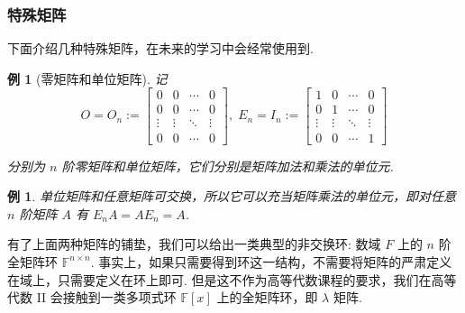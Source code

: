 \documentclass[10pt,openany]{article}
\theoremstyle{thmstyle} %
\theoremstyle{defstyle} %
\theoremstyle{prostyle} %
\theoremstyle{exastyle}
\newtheorem{example}[theorem]{例}
\theoremstyle{remstyle}
\newcommand{\F}{\mathbb{F}}
\begin{document}
\subsubsection{特殊矩阵}

下面介绍几种特殊矩阵，在未来的学习中会经常使用到.

\begin{example}[零矩阵和单位矩阵]
	记
	\[ O=O_n:=\begin{bmatrix}
		0 & 0 & \cdots & 0 \\
		0 & 0 & \cdots & 0 \\
		\vdots & \vdots & \ddots & \vdots \\
		0 & 0 & \cdots & 0
	\end{bmatrix}, \; E_n=I_n:=\begin{bmatrix}
	1 & 0 & \cdots & 0 \\
	0 & 1 & \cdots & 0 \\
	\vdots & \vdots & \ddots & \vdots \\
	0 & 0 & \cdots & 1
	\end{bmatrix} \]
	
	分别为 \( n \) 阶零矩阵和单位矩阵，它们分别是矩阵加法和乘法的单位元.
\end{example}

\begin{example}
	单位矩阵和任意矩阵可交换，所以它可以充当矩阵乘法的单位元，即对任意 \( n \) 阶矩阵 \( A \) 有 \( E_nA=AE_n=A \).
\end{example}

有了上面两种矩阵的铺垫，我们可以给出一类典型的非交换环: 数域 \( F \) 上的 \( n \) 阶全矩阵环 \( \F^{n \times n} \). 事实上，如果只需要得到环这一结构，不需要将矩阵的严肃定义在域上，只需要定义在环上即可. 但是这不作为高等代数课程的要求，我们在高等代数 II 会接触到一类多项式环 \( \F[x] \) 上的全矩阵环，即 \( \lambda \) 矩阵.
\end{document}
